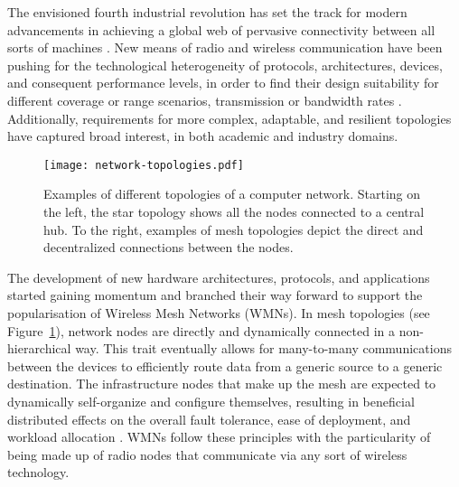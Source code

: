 The envisioned fourth industrial revolution has set the track for modern advancements in achieving a global web of pervasive connectivity between all sorts of machines \cite{akyildiz2005wireless, cilfone2019wireless}. New means of radio and wireless communication have been pushing for the technological heterogeneity of protocols, architectures, devices, and consequent performance levels, in order to find their design suitability for different coverage or range scenarios, transmission or bandwidth rates \cite{sichitiu2005wireless}. Additionally, requirements for more complex, adaptable, and resilient topologies have captured broad interest, in both academic and industry domains. 

\begin{figure} [ht]
  \begin{center}
  \texttt{[image: network-topologies.pdf]}
  \caption{Examples of different topologies of a computer network. Starting on the left, the star topology shows all the nodes connected to a central hub. To the right, examples of mesh topologies depict the direct and decentralized connections between the nodes.}
  \label{fig:mesh-network-topology}
  \end{center}
\end{figure}

The development of new hardware architectures, protocols, and applications started gaining momentum and branched their way forward to support the popularisation of Wireless Mesh Networks (WMNs). In mesh topologies (see Figure~\ref{fig:mesh-network-topology}), network nodes are directly and dynamically connected in a non-hierarchical way. This trait eventually allows for many-to-many communications between the devices to efficiently route data from a generic source to a generic destination. The infrastructure nodes that make up the mesh are expected to dynamically self-organize and configure themselves, resulting in beneficial distributed effects on the overall fault tolerance, ease of deployment, and workload allocation \cite{cilfone2019wireless, sichitiu2005wireless}. WMNs follow these principles with the particularity of being made up of radio nodes that communicate via any sort of wireless technology.

